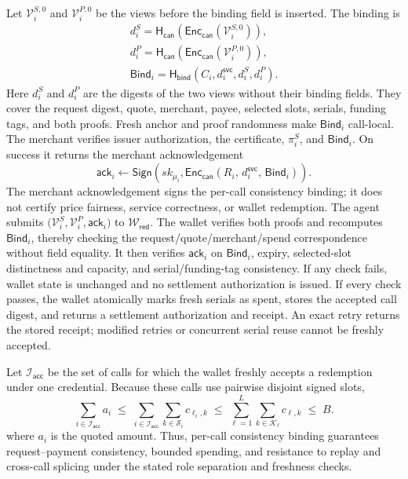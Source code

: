 \documentclass[letterpaper]{article}
\newcommand{\hash}{\mathsf{H}_{\mathsf{can}}}
\newcommand{\hashBind}{\mathsf{H}_{\mathsf{bind}}}
\begin{document}
Let \(\mathcal V_i^{S,0}\) and \(\mathcal V_i^{P,0}\) be the views before the
binding field is inserted. The binding is
\begin{equation}
\begin{aligned}
d_i^S
=
\hash\!\left(
  \mathsf{Enc}_{\mathsf{can}}(\mathcal V_i^{S,0})
\right),
\\
d_i^P
=
\hash\!\left(
  \mathsf{Enc}_{\mathsf{can}}(\mathcal V_i^{P,0})
\right),
\\
\mathsf{Bind}_i
=
\hashBind\!\left(
  C_i,
  d_i^{\mathsf{svc}},
  d_i^S,
d_i^P
\right).
\end{aligned}
\label{eq:main-bind}
\end{equation}
Here \(d_i^S\) and \(d_i^P\) are the digests of the two views without their
binding fields. They cover the request digest, quote, merchant, payee,
selected slots, serials, funding tags, and both proofs. Fresh anchor and proof
randomness make \(\mathsf{Bind}_i\) call-local. The merchant verifies issuer authorization, the certificate, \(\pi_i^S\), and
\(\mathsf{Bind}_i\). On success it returns the merchant acknowledgement
\begin{equation}
\mathsf{ack}_i
\leftarrow
\mathsf{Sign}\!\left(
  sk_{\mu_i},
  \mathsf{Enc}_{\mathsf{can}}\!\left(
    R_i,\,
    d_i^{\mathsf{svc}},\,
    \mathsf{Bind}_i
  \right)
\right).
\label{eq:merchant-ack}
\end{equation}
The merchant acknowledgement signs the per-call consistency binding;
it does not certify price fairness, service correctness, or wallet
redemption. The agent submits
\(\bigl(\mathcal V_i^S,\mathcal V_i^P,\mathsf{ack}_i\bigr)\) to
\(\mathcal W_{\mathsf{red}}\). The wallet verifies both proofs and recomputes
\(\mathsf{Bind}_i\), thereby checking the request/quote/merchant/spend
correspondence without field equality. It then verifies \(\mathsf{ack}_i\) on
\(\mathsf{Bind}_i\), expiry, selected-slot distinctness and capacity, and
serial/funding-tag consistency. If any check fails, wallet state is unchanged
and no settlement authorization is issued. If every check passes, the wallet atomically
marks fresh serials as spent, stores the accepted call digest, and returns a
settlement authorization and receipt. An exact retry returns the stored
receipt; modified retries or concurrent serial reuse cannot be freshly accepted.

Let \(\mathcal I_{\mathsf{acc}}\) be the set of calls for which the wallet
freshly accepts a redemption under one credential. Because these calls use
pairwise disjoint signed slots,
\begin{equation}
\sum_{i\in\mathcal I_{\mathsf{acc}}} a_i
\;\le\;
\sum_{i\in\mathcal I_{\mathsf{acc}}}
\sum_{k\in\mathcal S_i}
c_{\ell_i,k}
\;\le\;
\sum_{\ell=1}^{L}
\sum_{k\in\mathcal K_\ell}
c_{\ell,k}
\;\le\; B.
\label{eq:aggregate-budget}
\end{equation}
where \(a_i\) is the quoted amount.
Thus, per-call consistency binding guarantees request--payment consistency,
bounded spending, and resistance to replay and cross-call splicing under the
stated role separation and freshness checks.
\end{document}
